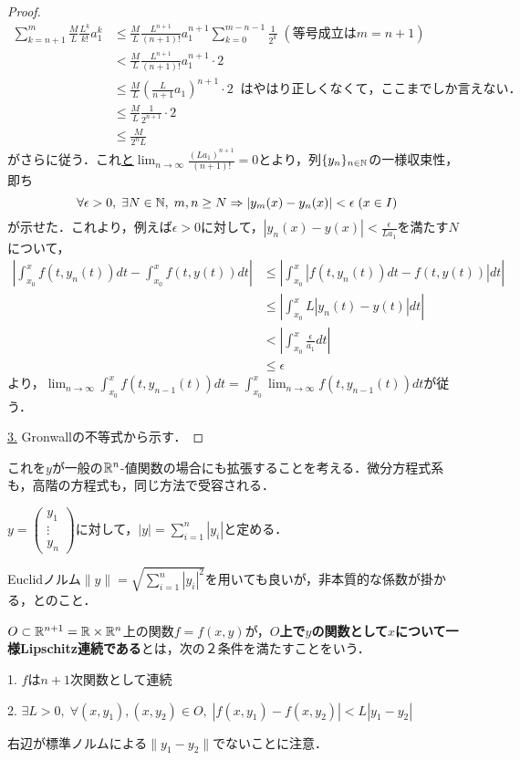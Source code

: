 \documentclass[uplatex,dvipdfmx]{jsreport}
\begin{document}
\begin{proof}
    \begin{align*}
        \sum^m_{k=n+1}\frac{M}{L}\frac{L^k}{k!}a_1^k &\le \frac{M}{L}\frac{L^{n+1}}{(n+1)!}a_1^{n+1}\sum^{m-n-1}_{k=0}\frac{1}{2^k}\;(等号成立はm=n+1)\\
        &< \frac{M}{L}\frac{L^{n+1}}{(n+1)!}a_1^{n+1}\cdot 2\\
        &\le \frac{M}{L}\left(\frac{L}{n+1}a_1\right)^{n+1}\cdot 2\;\;はやはり正しくなくて，ここまでしか言えない．\\
        &\le \frac{M}{L}\frac{1}{2^{n+1}}\cdot 2\\
        &\le \frac{M}{2^{n}L}
    \end{align*}
    がさらに従う．これ\underline{と$\lim_{n\to\infty}\frac{(La_1)^{n+1}}{(n+1)!}=0$}とより，列$\{y_n\}_{n\in\mathbb{N}}$の一様収束性，即ち
    \[ \forall\epsilon>0,\;\exists N\in\mathbb{N},\;m,n\ge N\Rightarrow |y_m(x)-y_n(x)|<\epsilon\;(x\in I) \]
    が示せた．これより，例えば$\epsilon>0$に対して，$|y_n(x)-y(x)|<\frac{\epsilon}{La_1}$を満たす$N$について，
    \begin{align*}
        \left|\int^x_{x_0}f(t,y_n(t))dt-\int^x_{x_0}f(t,y(t))dt\right| &\le \left|\int^x_{x_0}|f(t,y_n(t))dt-f(t,y(t))|dt\right|\\
        &\le \left|\int^x_{x_0}L|y_n(t)-y(t)|dt\right|\\
        &< \left|\int^x_{x_0}\frac{\epsilon}{a_1}dt\right|\\
        &\le \epsilon
    \end{align*}
    より，$\lim_{n\to\infty}\int^x_{x_0}f(t,y_{n-1}(t))dt=\int^x_{x_0}\lim_{n\to\infty}f(t,y_{n-1}(t))dt$が従う．

    \underline{3.} Gronwallの不等式から示す．
\end{proof}

これを$y$が一般の$\mathbb{R}^n$-値関数の場合にも拡張することを考える．微分方程式系も，高階の方程式も，同じ方法で受容される．
\begin{definition}[ノルム]
    $y=\begin{pmatrix}y_1\\\vdots\\y_n\end{pmatrix}$に対して，$|y|=\sum^n_{i=1}|y_i|$と定める．
\end{definition}
\begin{remark}
    Euclidノルム$\|y\|=\sqrt{\sum^n_{i=1}|y_i|^2}$を用いても良いが，非本質的な係数が掛かる，とのこと．
\end{remark}
\begin{definition}[一様Lipschitz連続]
    $O\subset\mathbb{R}^{n+1}=\mathbb{R}\times\mathbb{R}^n$上の関数$f=f(x,y)$が，\textbf{$O$上で$y$の関数として$x$について一様Lipschitz連続である}とは，次の２条件を満たすことをいう．

    1. $f$は$n+1$次関数として連続

    2. $\exists L>0,\; \forall (x,y_1),(x,y_2)\in O,\; |f(x,y_1)-f(x,y_2)|<L|y_1-y_2|$
\end{definition}
\begin{remark}
    右辺が標準ノルムによる$\|y_1-y_2\|$でないことに注意．
\end{remark}
\end{document}
